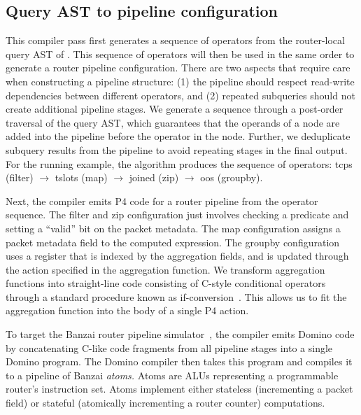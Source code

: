 \subsection{Query AST to pipeline configuration}
\label{sec:pipeline-layout}

This compiler pass first generates a sequence of operators from the
router-local query AST of . This sequence of
operators will then be used in the same order to generate a router pipeline
configuration. There are two aspects that require care when constructing a
pipeline structure: (1) the pipeline should respect read-write dependencies
between different operators, and (2) repeated subqueries should not create
additional pipeline stages. We generate a sequence through a post-order
traversal of the query AST, which guarantees that the operands of a node are
added into the pipeline before the operator in the node. Further, we
deduplicate subquery results from the pipeline to avoid repeating stages in the
final output. For the running example, the algorithm produces the sequence of
operators: {\ct tcps} ({\ct filter}) $\rightarrow$ {\ct tslots} ({\ct map})
$\rightarrow$ {\ct joined} ({\ct zip}) $\rightarrow$ {\ct oos} ({\ct groupby}).

Next, the compiler emits P4 code for a router pipeline
from the operator sequence.  The {\ct filter} and {\ct zip} configuration just
involves checking a predicate and setting a ``valid'' bit on the packet
metadata. The {\ct map} configuration assigns a packet metadata field to the
computed expression. The {\ct groupby} configuration uses a register that is
indexed by the aggregation fields, and is updated through the action specified
in the aggregation function. We transform \TheSystem aggregation functions into
straight-line code consisting of C-style conditional operators through a
standard procedure known as if-conversion~\cite{if-conversion}. This allows us
to fit the aggregation function into the body of a single P4 action.

To target the Banzai router pipeline simulator~\cite{domino_sigcomm}, the
\TheSystem compiler emits Domino code by concatenating C-like code fragments
from all pipeline stages into a single Domino program. The Domino compiler then
takes this program and compiles it to a pipeline of Banzai {\em atoms.} Atoms
are ALUs representing a programmable router's instruction set. Atoms implement
either stateless (\eg incrementing a packet field) or stateful (\eg atomically
incrementing a router counter) computations.


